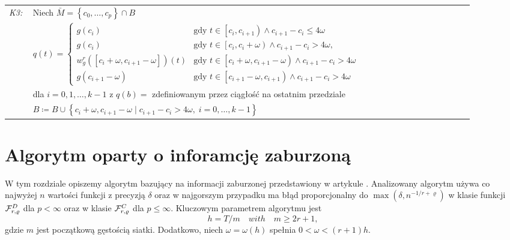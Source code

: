 \documentclass[oik, pdftex, robocza, man]{mgrwms}
\begin{document}
\begin{tabular}{p{0.045\linewidth} p{0.85\linewidth}}
        \textit{K3:}    & Niech $\bar{M} = \left\{ c_{0}, \dots, c_{p} \right\} \cap B$ \\
                        & $q(t)= \begin{cases}
                            g\left(c_{i}\right)                                                 &\text{gdy } t \in \left[c_{i}, c_{i+1}\right) \land c_{i+1}-c_{i} \leq 4 \omega \\ 
                            g\left(c_{i}\right)                                                 &\text{gdy } t \in \left[c_{i}, c_{i}+\omega\right) \land c_{i+1}-c_{i}>4 \omega, \\ 
                            w_{g}^{r}\left(\left[c_{i}+\omega, c_{i+1}-\omega\right]\right)(t)  &\text{gdy } t \in\left[c_{i}+\omega, c_{i+1}-\omega\right) \land c_{i+1}-c_{i}>4 \omega \\ 
                            g\left(c_{i+1}-\omega\right)                                        &\text{gdy } t \in\left[c_{i+1}-\omega, c_{i+1}\right) \land c_{i+1}-c_{i}>4 \omega
                            \end{cases}$ \\
                        & dla $i=0,1,\dots,k-1$ z $q(b) = $ zdefiniowanym przez ciągłość na ostatnim przedziale \\
                        & $B \coloneqq B \cup \left\{ c_{i} + \omega, c_{i+1} - \omega \mid c_{i+1} - c_{i} > 4\omega,\; i=0,\dots,k-1 \right\}$ \\

    \end{tabular} \vspace{10pt}


\section{Algorytm oparty o inforamcję zaburzoną}

    W tym rozdziale opiszemy algorytm bazujący na informacji zaburzonej przedstawiony w artykule \cite{AoP}. Analizowany algorytm używa co najwyżej $n$ wartości funkcji z precyzją $\delta $ oraz w najgorszym przypadku ma błąd proporcjonalny do $\max{(\delta, n^{-1 / r + \varrho })}$ w klasie funkcji $\mathcal{F}^D_{r,\varrho }$ dla $p < \infty$ oraz w klasie $\mathcal{F}^C_{r,\varrho }$ dla $p \leq \infty$. Kluczowym parametrem algorytmu jest
    $$
        h = T / m \quad with \quad  m \geq 2r + 1,
    $$
    gdzie $m$ jest początkową gęstością siatki. Dodatkowo, niech $\omega  = \omega(h)$ spełnia $0 < \omega < (r + 1)h $.
\end{document}

